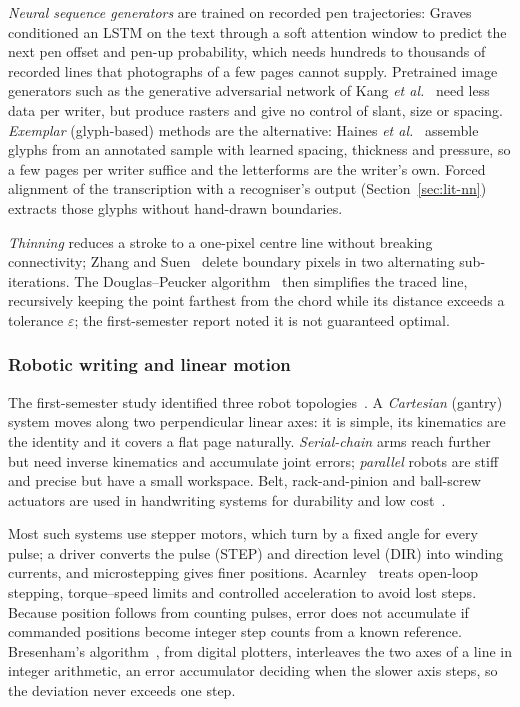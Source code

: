 \emph{Neural sequence generators} are trained on recorded pen trajectories: Graves~\cite{graves2013} conditioned an LSTM on the text through a soft attention window to predict the next pen offset and pen-up probability, which needs hundreds to thousands of recorded lines that photographs of a few pages cannot supply. Pretrained image generators such as the generative adversarial network of Kang \emph{et al.}~\cite{kang2020} need less data per writer, but produce rasters and give no control of slant, size or spacing. \emph{Exemplar} (glyph-based) methods are the alternative: Haines \emph{et al.}~\cite{haines2016} assemble glyphs from an annotated sample with learned spacing, thickness and pressure, so a few pages per writer suffice and the letterforms are the writer's own. Forced alignment of the transcription with a recogniser's output (Section~\ref{sec:lit-nn}) extracts those glyphs without hand-drawn boundaries.

\emph{Thinning} reduces a stroke to a one-pixel centre line without breaking connectivity; Zhang and Suen~\cite{zhang1984} delete boundary pixels in two alternating sub-iterations. The Douglas--Peucker algorithm~\cite{douglas1973} then simplifies the traced line, recursively keeping the point farthest from the chord while its distance exceeds a tolerance $\varepsilon$; the first-semester report noted it is not guaranteed optimal.

\subsubsection{Robotic writing and linear motion}
\label{sec:lit-robot}

The first-semester study identified three robot topologies~\cite{teikari2016}. A \emph{Cartesian} (gantry) system moves along two perpendicular linear axes: it is simple, its kinematics are the identity and it covers a flat page naturally. \emph{Serial-chain} arms reach further but need inverse kinematics and accumulate joint errors; \emph{parallel} robots are stiff and precise but have a small workspace. Belt, rack-and-pinion and ball-screw actuators are used in handwriting systems for durability and low cost~\cite{acarnley2002}.

Most such systems use stepper motors, which turn by a fixed angle for every pulse; a driver converts the pulse (STEP) and direction level (DIR) into winding currents, and microstepping gives finer positions. Acarnley~\cite{acarnley2002} treats open-loop stepping, torque--speed limits and controlled acceleration to avoid lost steps. Because position follows from counting pulses, error does not accumulate if commanded positions become integer step counts from a known reference. Bresenham's algorithm~\cite{bresenham1965}, from digital plotters, interleaves the two axes of a line in integer arithmetic, an error accumulator deciding when the slower axis steps, so the deviation never exceeds one step.

